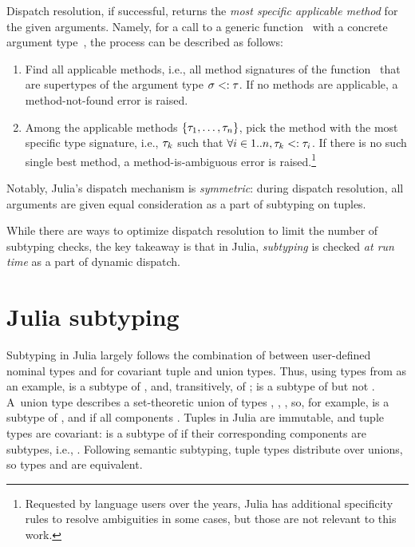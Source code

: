 Dispatch resolution, if successful, returns the \emph{most specific applicable
method} for the given arguments.
Namely, for a call to a generic function~ with a concrete argument
type~\gty, the process can be described as follows:
\begin{enumerate}
  \item Find all applicable methods, i.e., all method signatures \ty of the
    function~ that are supertypes of the argument type $\sigma <: \tau$.
    If no methods are applicable, a method-not-found error is raised.
  \item Among the applicable methods $\{\tau_1, \ldots, \tau_n\}$,
    pick the method with the most specific type signature,
    i.e., $\tau_k$ such that $\forall i\in1..n, \tau_k <: \tau_i$.
    If there is no such single best method, a method-is-ambiguous
    error is raised.\footnote{Requested by language users over the years,
    Julia has additional specificity rules to resolve ambiguities in some cases,
    but those are not relevant to this work.}
\end{enumerate}
Notably, Julia's dispatch mechanism is \emph{symmetric}:
during dispatch resolution, all arguments are given
equal consideration as a part of subtyping on tuples.

While there are ways to optimize dispatch resolution to limit the number of
subtyping checks, the key takeaway is that %
in Julia, \emph{subtyping} is checked \emph{at run time} as a part of dynamic dispatch.

\section{Julia subtyping}\label{sec:2:subtyping}

Subtyping in Julia largely follows the combination of
 between user-defined nominal types and
 for covariant tuple and union types.
Thus, using types from  as an example,
 is a subtype of , and, transitively, of ;
 is a subtype of  but not
.
A~union type  describes a set-theoretic union of
types , , , so, for example,  is a subtype of
, and  if all
components .
Tuples in Julia are immutable, and tuple types are covariant:
 is a subtype of  if
their corresponding components are subtypes, i.e., .
Following semantic subtyping, tuple types distribute over unions,
so types  and
 are equivalent.


